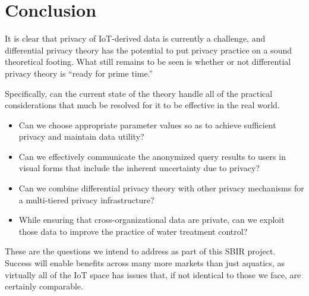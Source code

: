 \section{Conclusion}
\label{sec:conclude}

It is clear that privacy of IoT-derived data is currently a challenge,
and differential privacy theory has the potential to put privacy practice
on a sound theoretical footing.  What still remains to be seen is whether
or not differential privacy theory is ``ready for prime time.''

Specifically, can the current state of the theory handle all of the
practical considerations that much be resolved for it to be effective
in the real world.
\begin{itemize}
\item Can we choose appropriate parameter values so as to achieve
sufficient privacy and maintain data utility?
\item Can we effectively communicate the anonymized query results to
users in visual forms that include the inherent uncertainty due to privacy?
\item Can we combine differential privacy theory with other privacy
mechanisms for a multi-tiered privacy infrastructure?
\item While ensuring that cross-organizational data are private, can we
exploit those data to improve the practice of water treatment control?
\end{itemize}
These are the questions we intend to address as part of this SBIR project.
Success will enable benefits across many more markets than just aquatics,
as virtually all of the IoT space has issues that, if not identical to
those we face, are certainly comparable.
